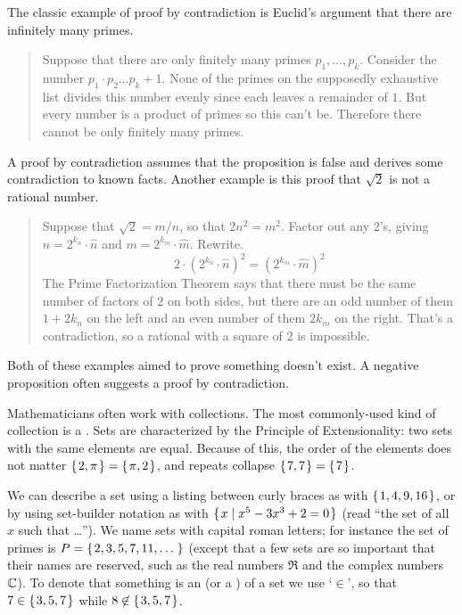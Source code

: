 The classic example of proof by contradiction is Euclid's
argument that there are infinitely many primes.
\begin{quote}\small
Suppose that there are only finitely many primes \( p_1,\dots,p_k \).
Consider the number \( p_1\cdot p_2\dots p_k +1 \).
None of the primes on the supposedly exhaustive list divides this number
evenly since each leaves a remainder of \( 1 \).
But every number is a product of primes so this can't be.
Therefore there cannot be only finitely many primes.
\end{quote}

A proof by contradiction assumes that the proposition is
false and derives some contradiction to known facts.
Another example is this proof that
\( \sqrt{2} \) is not a rational number.
\begin{quote}\small
Suppose that  \( \sqrt{2}=m/n \), so that $2n^2=m^2$.
Factor out any \( 2 \)'s, giving
\( n=2^{k_n}\cdot \hat{n} \)
and
\( m=2^{k_m}\cdot \hat{m} \).
Rewrite.
\begin{equation*}
  2\cdot (2^{k_n}\cdot \hat{n})^2
  =
  (2^{k_m}\cdot \hat{m})^2
\end{equation*}
The Prime Factorization Theorem says that there must be the same number of
factors of \( 2 \) on both sides, but there are an odd number of them
\( 1+2k_n \) on the left and an even number of them \( 2k_m \) on the right.
That's a contradiction, so a rational with a square of
\( 2 \) is impossible.
\end{quote}

Both of these examples aimed to prove something doesn't exist.
A negative proposition often suggests a proof by contradiction.















Mathematicians often work with collections. 
The most commonly-used kind of collection is a . 
Sets are characterized by the Principle of Extensionality: 
two sets with the same elements are equal. 
Because of this, the order of the elements does not matter 
\( \mbox{$\{\hspace{0.1em}2,\pi\hspace{0.1em}\}$}=\mbox{$\{\hspace{0.1em}\pi,2\hspace{0.1em}\}$} \), 
and
repeats collapse \( \mbox{$\{\hspace{0.1em}7,7\hspace{0.1em}\}$}=\mbox{$\{\hspace{0.1em}7\hspace{0.1em}\}$} \).

We can describe a set using a listing between curly braces as with
\( \mbox{$\{\hspace{0.1em} 1,4,9,16 \hspace{0.1em}\}$} \), or by using set-builder notation as with
\( \mbox{$\{\hspace{0.1em}x\mid x^5-3x^3+2=0 \hspace{0.1em}\}$} \) (read ``the set of all \( x \)
such that \ldots'').
We name sets with capital roman letters; for instance the set of primes is
\( P=\mbox{$\{\hspace{0.1em}2,3,5,7,11,\ldots\,\hspace{0.1em}\}$} \) (except that a few sets 
are so important that their names are reserved, such as the
real numbers \( \Re \)
and the complex numbers \( \mathbb{C} \)).
To denote that something is an 
(or a ) of a set we
use `\(\in \)',
so that \( 7\in\mbox{$\{\hspace{0.1em}3,5,7\hspace{0.1em}\}$} \) while \( 8\not\in\mbox{$\{\hspace{0.1em}3,5,7\hspace{0.1em}\}$} \).

